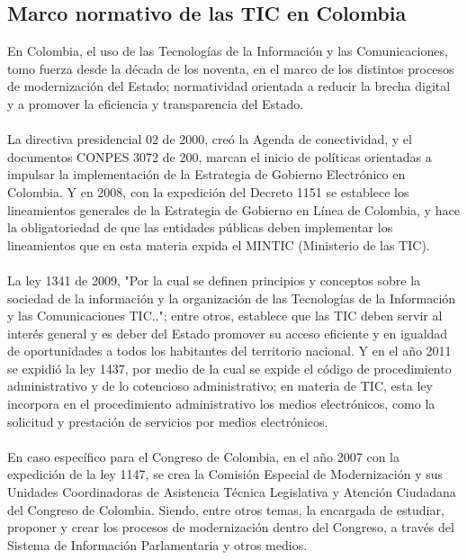 \documentclass[conference]{IEEEtran}
\begin{document}
 \subsection{Marco normativo de las TIC en Colombia}    
    En Colombia, el uso de las Tecnologías de la Información y las Comunicaciones, tomo fuerza desde la década de los noventa, en el marco de los distintos procesos de modernización del Estado; normatividad orientada a reducir la brecha digital y a promover la eficiencia y transparencia del Estado. \\ \\
    La directiva presidencial 02 de 2000, creó la Agenda de conectividad, y el documentos CONPES 3072 de 200, marcan el inicio de políticas orientadas a impulsar la implementación de la Estrategia de Gobierno Electrónico en Colombia. Y en 2008, con la expedición del Decreto 1151 se establece los lineamientos generales de la Estrategia de Gobierno en Línea de Colombia, y hace la obligatoriedad de que las entidades públicas deben implementar los lineamientos que en esta materia expida el MINTIC (Ministerio de las TIC).\\ \\ 
    La ley 1341 de 2009, "Por la cual se definen principios y conceptos sobre la sociedad de la información y la organización de las Tecnologías de la Información y las Comunicaciones TIC.."; entre otros, establece que las TIC deben servir al interés general y es deber del Estado promover su acceso eficiente y en igualdad de oportunidades a todos los habitantes del territorio nacional.  Y en el año 2011 se expidió la ley 1437, por medio de la cual se expide el código de procedimiento administrativo y de lo cotencioso administrativo; en materia de TIC, esta ley incorpora en el procedimiento administrativo los medios electrónicos, como la solicitud y prestación de servicios por medios electrónicos. \\ \\
    En caso específico para el Congreso de Colombia, en el año 2007 con la expedición de la ley 1147, se crea la Comisión Especial de Modernización y sus Unidades Coordinadoras de Asistencia Técnica Legislativa y Atención Ciudadana del Congreso de Colombia. Siendo, entre otros temas, la encargada de estudiar, proponer y crear los procesos de modernización dentro del Congreso, a través del Sistema de Información Parlamentaria y otros medios. \\ \\
    
    
\end{document}
